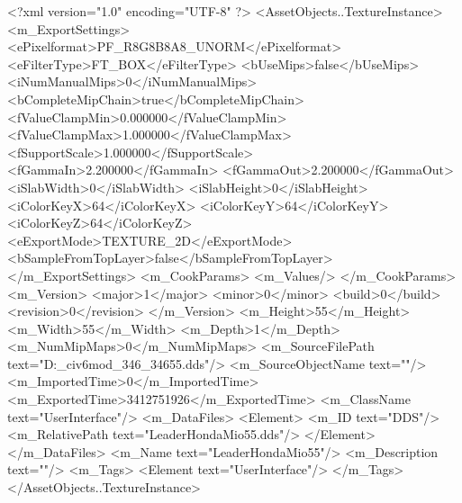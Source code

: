 <?xml version="1.0" encoding="UTF-8" ?>
<AssetObjects..TextureInstance>
	<m_ExportSettings>
		<ePixelformat>PF_R8G8B8A8_UNORM</ePixelformat>
		<eFilterType>FT_BOX</eFilterType>
		<bUseMips>false</bUseMips>
		<iNumManualMips>0</iNumManualMips>
		<bCompleteMipChain>true</bCompleteMipChain>
		<fValueClampMin>0.000000</fValueClampMin>
		<fValueClampMax>1.000000</fValueClampMax>
		<fSupportScale>1.000000</fSupportScale>
		<fGammaIn>2.200000</fGammaIn>
		<fGammaOut>2.200000</fGammaOut>
		<iSlabWidth>0</iSlabWidth>
		<iSlabHeight>0</iSlabHeight>
		<iColorKeyX>64</iColorKeyX>
		<iColorKeyY>64</iColorKeyY>
		<iColorKeyZ>64</iColorKeyZ>
		<eExportMode>TEXTURE_2D</eExportMode>
		<bSampleFromTopLayer>false</bSampleFromTopLayer>
	</m_ExportSettings>
	<m_CookParams>
		<m_Values/>
	</m_CookParams>
	<m_Version>
		<major>1</major>
		<minor>0</minor>
		<build>0</build>
		<revision>0</revision>
	</m_Version>
	<m_Height>55</m_Height>
	<m_Width>55</m_Width>
	<m_Depth>1</m_Depth>
	<m_NumMipMaps>0</m_NumMipMaps>
	<m_SourceFilePath text="D:\Documents\GitHub\UzukiShimamura_civ6mod\HondaMio_346\HondaMio_346\Textures\LeaderHondaMio55.dds"/>
	<m_SourceObjectName text=""/>
	<m_ImportedTime>0</m_ImportedTime>
	<m_ExportedTime>3412751926</m_ExportedTime>
	<m_ClassName text="UserInterface"/>
	<m_DataFiles>
		<Element>
			<m_ID text="DDS"/>
			<m_RelativePath text="LeaderHondaMio55.dds"/>
		</Element>
	</m_DataFiles>
	<m_Name text="LeaderHondaMio55"/>
	<m_Description text=""/>
	<m_Tags>
		<Element text="UserInterface"/>
	</m_Tags>
</AssetObjects..TextureInstance>

